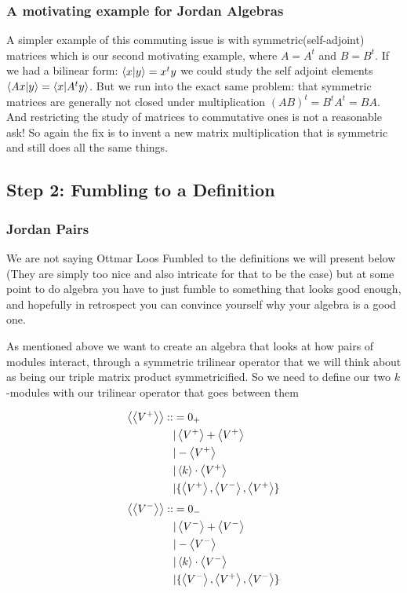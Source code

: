 \subsubsection*{A motivating example for Jordan Algebras}
\label{sec:symmats}
A simpler example of this commuting issue is with symmetric(self-adjoint) matrices which is our second motivating example, where $A=A^t$ and $B=B^t$. 
If we had a bilinear form: $\left\langle x|y \right\rangle=x^ty$ we could study the self adjoint elements $\left\langle Ax|y \right\rangle=\left\langle x|A^ty \right\rangle$. 
But we run into the exact same problem: that symmetric matrices are generally not closed under multiplication
$(AB)^t=B^tA^t=BA$. And restricting the study of matrices to commutative ones is not a reasonable ask! 
So again the fix is to invent a new matrix multiplication that is symmetric and still does all the same things.


\subsection{Step 2: Fumbling to a Definition}
\subsubsection{Jordan Pairs}
We are not saying Ottmar Loos Fumbled to the definitions we will present below 
(They are simply too nice and also intricate for that to be the case) but at some point to do
algebra you have to just fumble to something that looks good enough, and hopefully in retrospect you can convince yourself
why your algebra is a good one.

As mentioned above we want to create an algebra that looks at how pairs of modules interact, through a symmetric 
trilinear operator that we will think about as being our triple matrix product symmetricified.
So we need to define our two $k$-modules with our trilinear operator that goes between them

\begin{align*}\left\langle \left\langle V^+ \right\rangle \right\rangle::&= 0_+ \\
                             &| \left\langle V^+ \right\rangle+\left\langle V^+ \right\rangle \\
                             &| -\left\langle V^+ \right\rangle \\
                             &| \left\langle k \right\rangle\cdot \left\langle V^+ \right\rangle\\ 
                             &| \{\left\langle V^+ \right\rangle, \left\langle V^- \right\rangle, \left\langle V^+ \right\rangle\}\end{align*}
\begin{align*}\left\langle \left\langle V^- \right\rangle \right\rangle::&= 0_- \\
    &| \left\langle V^- \right\rangle+\left\langle V^- \right\rangle \\
    &| -\left\langle V^- \right\rangle \\
    &| \left\langle k \right\rangle\cdot \left\langle V^- \right\rangle \\
    &| \{\left\langle V^- \right\rangle, \left\langle V^+ \right\rangle, \left\langle V^- \right\rangle\}\end{align*}
 
